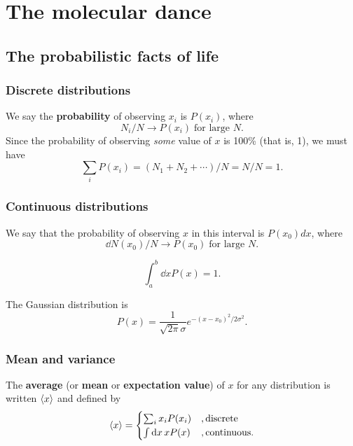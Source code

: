 %
%
%
\chapter{The molecular dance}

\section{The probabilistic facts of life}
\subsection{Discrete distributions}
We say the \textbf{probability} of observing $x_i$ is $ P(x_i) $, where
\begin{equation}
	N_i / N \rightarrow P(x_i) \; \text{for large } N.
\end{equation}
Since the probability of observing \emph{some} value of $x$ is 100\% (that is, 1), we must have
\begin{equation}
	\sum_{i} P(x_i) = (N_1 + N_2 + \cdots ) / N = N / N = 1.
\end{equation}

\subsection{Continuous distributions}
We say that the probability of observing $x$ in this interval is $P(x_0)dx$, where
\begin{equation}
	\dd{N(x_0)/N} \rightarrow P(x_0) \; \text{for large }N.
\end{equation}

\begin{equation}
	\int_{a}^{b}\dd{x}P(x) = 1.
\end{equation}

The Gaussian distribution is
\begin{equation}
	P(x) = \frac{1}{\sqrt{2\pi}\sigma} e^{-(x - x_0)^2/2\sigma^2}.
\end{equation}

\subsection{Mean and variance}
The \textbf{average} (or \textbf{mean} or \textbf{expectation value}) of $x$ for any distribution is written $ \expval{x} $ and defined by
\begin{equation}
	\expval{x} = \begin{cases}
		\sum_i x_i P(x_i) &, \text{discrete}\\
		\int \dd{x} xP(x) &, \text{continuous.}
	\end{cases}
\end{equation}

